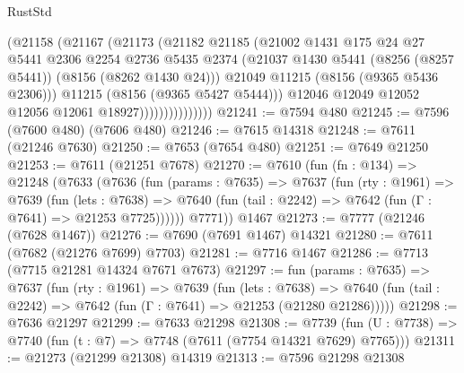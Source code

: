 \begin{lexlean}{RustStd}
\begin{coremodule}
                            (@21158
                              (@21167
                                (@21173
                                  (@21182
                                    @21185
                                    (@21002
                                      @1431
                                      @175
                                      @24
                                      @27
                                      @5441
                                      @2306
                                      @2254
                                      @2736
                                      @5435
                                      @2374
                                      (@21037
                                        @1430
                                        @5441
                                        (@8256 (@8257 @5441))
                                        (@8156 (@8262 @1430 @24)))
                                      @21049
                                      @11215
                                      (@8156 (@9365 @5436 @2306)))
                                    @11215
                                    (@8156 (@9365 @5427 @5444)))
                                  @12046
                                  @12049
                                  @12052
                                  @12056
                                  @12061
                                  @18927)))))))))))))))
@21241 := @7594 @480
@21245 := @7596 (@7600 @480) (@7606 @480)
@21246 := @7615 @14318
@21248 := @7611 (@21246 @7630)
@21250 := @7653 (@7654 @480)
@21251 := @7649 @21250
@21253 := @7611 (@21251 @7678)
@21270 := @7610
    (fun (fn : @134) =>
    @21248
      (@7633
        (@7636
          (fun (params : @7635) =>
          @7637
            (fun (rty : @1961) =>
            @7639
              (fun (lets : @7638) =>
              @7640 (fun (tail : @2242) => @7642 (fun (Γ : @7641) => @21253 @7725))))))
        @7771))
    @1467
@21273 := @7777 (@21246 (@7628 @1467))
@21276 := @7690 (@7691 @1467) @14321
@21280 := @7611 (@7682 (@21276 @7699) @7703)
@21281 := @7716 @1467
@21286 := @7713 (@7715 @21281 @14324 @7671 @7673)
@21297 := fun (params : @7635) =>
  @7637
    (fun (rty : @1961) =>
    @7639
      (fun (lets : @7638) =>
      @7640 (fun (tail : @2242) => @7642 (fun (Γ : @7641) => @21253 (@21280 @21286)))))
@21298 := @7636 @21297
@21299 := @7633 @21298
@21308 := @7739
    (fun (U : @7738) => @7740 (fun (t : @7) => @7748 (@7611 (@7754 @14321 @7629) @7765)))
@21311 := @21273 (@21299 @21308) @14319
@21313 := @7596 @21298 @21308

\end{coremodule}
\end{lexlean}
